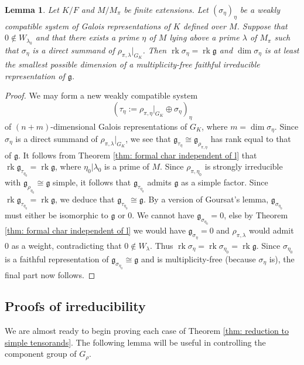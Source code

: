 \documentclass{amsart}
\newtheorem{lemma}[theorem]{Lemma}
\theoremstyle{definition}
\numberwithin{equation}{section} %
\newcommand{\rk}{\operatorname{rk}}
\newcommand{\mf}[1]{\mathfrak{#1}}
\begin{document}
\begin{lemma} \label{lemma: summand has same rank}
Let $K/F$ and $M/M_\pi$ be finite extensions.
Let $(\sigma_\eta)_\eta$ be a weakly compatible system of Galois representations of $K$ defined over $M$.
Suppose that $0 \not\in W_{\lambda_0}$ and that there exists a prime $\eta$ of $M$ lying above a prime $\lambda$ of $M_\pi$ such that
$\sigma_\eta$ is a direct summand of $\rho_{\pi,\lambda}|_{G_K}$.
Then $\rk \sigma_\eta = \rk \mf{g}$ and $\dim \sigma_\eta$ is at least the smallest possible dimension of a multiplicity-free faithful irreducible representation of $\mf{g}$.
\end{lemma}
\begin{proof}
We may form a new weakly compatible system
\[
(\tau_\eta := \rho_{\pi,\eta}|_{G_{K}} \oplus \sigma_\eta)_\eta
\]
of $(n+m)$-dimensional Galois representations of $G_{K}$, where $m = \dim \sigma_\eta$.
Since $\sigma_\eta$ is a direct summand of $\rho_{\pi,\lambda}|_{G_K}$, we see that $\mf{g}_{\tau_\eta} \cong \mf{g}_{\rho_{\pi,\eta}}$ has rank equal to that of $\mf{g}$.
It follows from Theorem \ref{thm: formal char independent of l} that $\rk \mf{g}_{\tau_{\eta_0}} = \rk \mf{g}$, where $\eta_0| \lambda_0$ is a prime of $M$.
Since $\rho_{\pi,\eta_0}$ is strongly irreducible with $\mf{g}_{\rho_{\eta_0}} \cong \mf{g}$ simple, it follows that $\mf{g}_{\tau_{\eta_0}}$ admits $\mf{g}$ as a simple factor.
Since $\rk \mf{g}_{\tau_{\eta_0}} = \rk \mf{g}$, we deduce that $\mf{g}_{\tau_{\eta_0}} \cong \mf{g}$.
By a version of Goursat's lemma, $\mf{g}_{\sigma_{\eta_0}}$ must either be isomorphic to $\mf{g}$ or $0$.
We cannot have $\mf{g}_{\sigma_{\eta_0}} = 0$, else by Theorem \ref{thm: formal char independent of l} we would have $\mf{g}_{\sigma_{\eta}} = 0$ and $\rho_{\pi,\lambda}$ would admit $0$ as a weight, contradicting that $0 \not\in W_{\lambda}$.
Thus $\rk \sigma_\eta = \rk \sigma_{\eta_0} = \rk \mf{g}$.
Since $\sigma_{\eta_0}$ is a faithful representation of $\mf{g}_{\sigma_{\eta_0}} \cong \mf{g}$ and is multiplicity-free (because $\sigma_\eta$ is), the final part now follows.
\end{proof}

\subsection{Proofs of irreducibility} \label{subsect: simple type irreducibility proofs}

We are almost ready to begin proving each case of Theorem \ref{thm: reduction to simple tensorands}.
The following lemma will be useful in controlling the component group of $G_\rho$.
\end{document}
